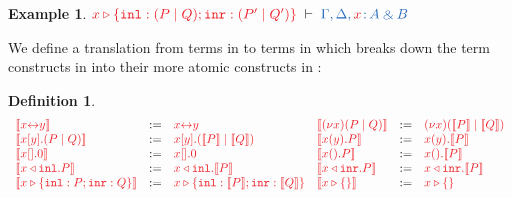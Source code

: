 \documentclass[draft,submission,copyright,creativecommons]{eptcs}
\newtheorem{definition}{Definition}
\newtheorem{example}{Example}
\begin{document}
\begin{example}
  \(
  \seq[\cpCase{x}{(\piPar{P}{Q})}{(\piPar{P'}{Q'})}]{
    \Gamma, \Delta, \tmty{x}{A \with B}}
  \)
\end{example}

We define a translation from terms in \cp to terms in \hcp which breaks down the term constructs in \cp into their more atomic constructs in \hcp:
\begin{definition}\label{def:cp2hcp-terms}
  \[
    \begin{array}{lcllcl}
         \tm{\mtf{\cpLink{x}{y}}}
      &  := & \tm{\cpLink{x}{y}}
      &  \tm{\mtf{\cpCut{x}{P}{Q}}}
      &  := & \tm{\piNew{x}{(\piPar{\mtf{P}}{\mtf{Q}})}}
      \\ \tm{\mtf{\cpSend{x}{y}{P}{Q}}}
      &  := & \tm{\piBoundSend{x}{y}{(\piPar{\mtf{P}}{\mtf{Q}})}}
      &  \tm{\mtf{\cpRecv{x}{y}{P}}}
      &  := & \tm{\piRecv{x}{y}{\mtf{P}}}
      \\ \tm{\mtf{\cpHalt{x}}}
      &  := & \tm{\piBoundSend{x}{}{\piHalt}}
      &  \tm{\mtf{\cpWait{x}{P}}}
      &  := & \tm{\piRecv{x}{}{\mtf{P}}}
      \\ \tm{\mtf{\cpInl{x}{P}}}
      &  := & \tm{\cpInl{x}{\mtf{P}}}
      &  \tm{\mtf{\cpInr{x}{P}}}
      &  := & \tm{\cpInr{x}{\mtf{P}}}
      \\ \tm{\mtf{\cpCase{x}{P}{Q}}}
      &  := & \tm{\cpCase{x}{\mtf{P}}{\mtf{Q}}}
      &  \tm{\mtf{\cpAbsurd{x}}}
      &  := & \tm{\cpAbsurd{x}}
    \end{array}
  \]
\end{definition}
\end{document}
